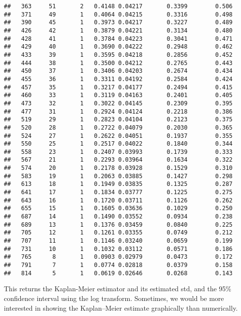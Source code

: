 \documentclass[]{book}
\theoremstyle{definition}
\theoremstyle{definition}
\theoremstyle{definition}
\theoremstyle{remark}
\begin{document}
\begin{verbatim}
##   363     51       2   0.4148 0.04217       0.3399        0.506
##   371     49       1   0.4064 0.04215       0.3316        0.498
##   390     45       1   0.3973 0.04217       0.3227        0.489
##   426     42       1   0.3879 0.04221       0.3134        0.480
##   428     41       1   0.3784 0.04223       0.3041        0.471
##   429     40       1   0.3690 0.04222       0.2948        0.462
##   433     39       1   0.3595 0.04218       0.2856        0.452
##   444     38       1   0.3500 0.04212       0.2765        0.443
##   450     37       1   0.3406 0.04203       0.2674        0.434
##   455     36       1   0.3311 0.04192       0.2584        0.424
##   457     35       1   0.3217 0.04177       0.2494        0.415
##   460     33       1   0.3119 0.04163       0.2401        0.405
##   473     32       1   0.3022 0.04145       0.2309        0.395
##   477     31       1   0.2924 0.04124       0.2218        0.386
##   519     29       1   0.2823 0.04104       0.2123        0.375
##   520     28       1   0.2722 0.04079       0.2030        0.365
##   524     27       1   0.2622 0.04051       0.1937        0.355
##   550     25       1   0.2517 0.04022       0.1840        0.344
##   558     23       1   0.2407 0.03993       0.1739        0.333
##   567     21       1   0.2293 0.03964       0.1634        0.322
##   574     20       1   0.2178 0.03928       0.1529        0.310
##   583     19       1   0.2063 0.03885       0.1427        0.298
##   613     18       1   0.1949 0.03835       0.1325        0.287
##   641     17       1   0.1834 0.03777       0.1225        0.275
##   643     16       1   0.1720 0.03711       0.1126        0.262
##   655     15       1   0.1605 0.03636       0.1029        0.250
##   687     14       1   0.1490 0.03552       0.0934        0.238
##   689     13       1   0.1376 0.03459       0.0840        0.225
##   705     12       1   0.1261 0.03355       0.0749        0.212
##   707     11       1   0.1146 0.03240       0.0659        0.199
##   731     10       1   0.1032 0.03112       0.0571        0.186
##   765      8       1   0.0903 0.02979       0.0473        0.172
##   791      7       1   0.0774 0.02818       0.0379        0.158
##   814      5       1   0.0619 0.02646       0.0268        0.143
\end{verbatim}

This returns the Kaplan-Meier estimator and its estimated std, and the
95\% confidence interval using the log transform. Sometimes, we would be
more interested in showing the Kaplan--Meier estimate graphically than
numerically.
\end{document}
